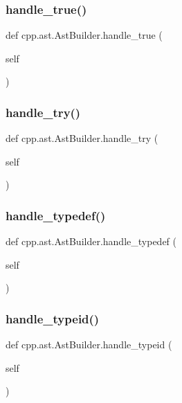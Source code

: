 \subsubsection{\texorpdfstring{handle\_true()}{handle\_true()}}
{\footnotesize\ttfamily def cpp.\+ast.\+Ast\+Builder.\+handle\+\_\+true (\begin{DoxyParamCaption}\item[{}]{self }\end{DoxyParamCaption})}

\mbox{\label{classcpp_1_1ast_1_1_ast_builder_a6c7998f3fdcd046718ff809dbe257645}} 
\subsubsection{\texorpdfstring{handle\_try()}{handle\_try()}}
{\footnotesize\ttfamily def cpp.\+ast.\+Ast\+Builder.\+handle\+\_\+try (\begin{DoxyParamCaption}\item[{}]{self }\end{DoxyParamCaption})}

\mbox{\label{classcpp_1_1ast_1_1_ast_builder_a808eb3d955ca2e3a957abb35dc577c66}} 
\subsubsection{\texorpdfstring{handle\_typedef()}{handle\_typedef()}}
{\footnotesize\ttfamily def cpp.\+ast.\+Ast\+Builder.\+handle\+\_\+typedef (\begin{DoxyParamCaption}\item[{}]{self }\end{DoxyParamCaption})}

\mbox{\label{classcpp_1_1ast_1_1_ast_builder_ac30cfc1a3a455310a9ccac885d2d0d7c}} 
\subsubsection{\texorpdfstring{handle\_typeid()}{handle\_typeid()}}
{\footnotesize\ttfamily def cpp.\+ast.\+Ast\+Builder.\+handle\+\_\+typeid (\begin{DoxyParamCaption}\item[{}]{self }\end{DoxyParamCaption})}

